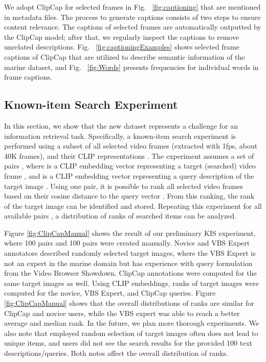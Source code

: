 \documentclass[runningheads]{llncs}
\begin{document}
We adopt ClipCap for selected frames in Fig. ~\ref{fig:captioning} that are mentioned in metadata files. The process to generate captions consists of two steps to ensure content relevance. The captions of selected frames are automatically outputted by the ClipCap model; after that, we regularly inspect the captions to remove unrelated descriptions. Fig.  ~\ref{fig:captioningExamples} shows selected frame captions of ClipCap that are utilized to describe semantic information of the marine dataset, and Fig. ~\ref{fig:Words} presents frequencies for individual words in frame captions.


\subsection{Known-item Search Experiment}
In this section, we show that the new dataset represents a challenge for an information retrieval task. Specifically, a known-item search experiment is performed using a subset of all selected video frames  (extracted with 1fps, about 40K frames), and their CLIP representations \cite{CLIP}. The experiment assumes a set of pairs , where  is a CLIP embedding vector representing a target (searched) video frame , and  is a CLIP embedding vector representing a query description of the target image .
Using one pair, it is possible to rank all selected video frames based on their cosine distance to the query vector . From this ranking, the rank of the target image  can be identified and stored. Repeating this experiment for all available pairs , a distribution of ranks of searched items can be analyzed.

Figure  \ref{fig:ClipCapManual} shows the result of our preliminary KIS experiment, where 100 pairs  and 100 pairs  were created manually. Novice and VBS Expert annotators described randomly selected target images, where the VBS Expert is not an expert in the marine domain but has experience with query formulation from the Video Browser Showdown. ClipCap annotations were computed for the same target images as well. Using CLIP embeddings, ranks of target images were computed for the novice, VBS Expert, and ClipCap queries. Figure \ref{fig:ClipCapManual} shows that the overall distributions of ranks are similar for ClipCap and novice users, while the VBS expert was able to reach a better average and median rank. In the future, we plan more thorough experiments.
We also note that employed random selection of target images often does not lead to unique items, and users did not see the search results for the provided 100 text descriptions/queries. Both notes affect the overall distribution of ranks.
\end{document}
